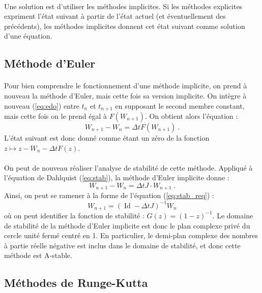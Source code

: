   \paragraph{}
  Une solution est d'utiliser les méthodes implicites.
  Si les méthodes explicites expriment l'état suivant à partir de l'état actuel (et éventuellement des précédents), les méthodes implicites donnent cet état suivant comme solution d'une équation.

  \subsection{Méthode d'Euler}

    \paragraph{}
    Pour bien comprendre le fonctionnement d'une méthode implicite, on prend à nouveau la méthode d'Euler, mais cette fois sa version implicite.
    On intègre à nouveau (\ref{eq:edo}) entre $t_n$ et $t_{n+1}$ en supposant le second membre constant, mais cette fois on le prend égal à $F\left(W_{n+1}\right)$.
    On obtient alors l'équation :
    \[W_{n+1} - W_n = \Delta tF\left(W_{n+1}\right)\ .\]
    L'état suivant est donc donné comme étant un zéro de la fonction $z\mapsto z - W_n - \Delta tF\left(z\right)$.

    \paragraph{}
    On peut de nouveau réaliser l'analyse de stabilité de cette méthode.
    Appliqué à l'équation de Dahlquist (\ref{eq:stab}), la méthode d'Euler implicite donne :
    \[W_{n+1} - W_n = \Delta tJ\cdot W_{n+1}\ .\]
    Ainsi, on peut se ramener à la forme de l'équation (\ref{eq:stab_req}) :
    \[W_{n+1} = \left(\operatorname{Id} - \Delta tJ\right)^{-1}W_n\]
    où on peut identifier la fonction de stabilité : $G\left(z\right) = \left(1-z\right)^{-1}$.
    Le domaine de stabilité de la méthode d'Euler implicite est donc le plan complexe privé du cercle unité fermé centré en 1.
    En particulier, le demi-plan complexe des nombres à partie réelle négative est inclus dans le domaine de stabilité, et donc cette méthode est A-stable.


  \subsection{Méthodes de Runge-Kutta}

